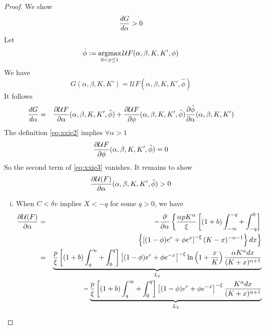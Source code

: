 \documentclass{article}
\begin{document}
\begin{proof}
  We show
  \[
  \frac{d G}{d \alpha} > 0
  \]
  Let
  \begin{equation}
    \label{eq:xxie2}
    \hat \phi := \operatorname*{argmax}_{0 < \phi \leq 1}
    \mathcal U F(\alpha, \beta, K, K', \phi)
  \end{equation}
  We have
  \[
  G(\alpha, \beta, K, K') = \mathcal U F(\alpha, \beta, K, K', \hat \phi)
  \]
  It follows
  \begin{eqnarray}
    \frac{d G}{d \alpha}
    &=&
    \frac{\partial \mathcal U F}{\partial \alpha}(\alpha, \beta, K, K', \hat \phi)
    + \frac{\partial \mathcal U F}{\partial \phi}(\alpha, \beta, K, K', \hat \phi)
    \frac{\partial \hat \phi}{\partial \alpha}(\alpha, \beta, K, K')
    \label{eq:xxie3}
  \end{eqnarray}
  The definition \eqref{eq:xxie2} implies $\forall \alpha > 1$
  \begin{equation}
    \label{eq:xxie4}
    \frac{\partial \mathcal U F}{\partial \phi}(\alpha, \beta, K, K', \hat \phi) = 0
  \end{equation}
  So the second term of \eqref{eq:xxie3} vanishes. It remains to show
  \[
  \frac{\partial \mathcal U(F)}{\partial \alpha}(\alpha, \beta, K, K', \hat \phi) > 0
  \]
  \begin{enumerate}[i.]
  \item When $C < \delta v$ implies $X < -q$ for some $q > 0$, we have
    \begin{eqnarray*}
      \pd{\mathcal U(F)}{\alpha}
      &=&
      - \frac{\partial}{\partial \alpha} \left\{
      {\alpha p K^\alpha \over \xi}
      \left[
      (1 + b)\int_{-\infty}^{-q} +
      \int_{-q}^0
      \right] \right. \\
      && \left.
      \left\{
      \left[
        (1 - \phi) e^r + \phi e^x
      \right]^{-\xi}
      (K - x)^{-\alpha - 1}
      \right\}
      dx \right\} \\
      &=&
      \underbrace{
      {p \over \xi}
      \left[
      (1 + b)\int_{q}^{\infty} +
      \int_{0}^q
      \right]
      \left[
        (1 - \phi) e^r + \phi e^{-x}
      \right]^{-\xi}
      \ln \left(
      1 + {x \over K}
      \right)
            {\alpha K^{\alpha} dx
              \over
              (K + x)^{\alpha + 1}
            }
      }_{L_1}\\
      && - \underbrace{
        {p \over \xi}
        \left[
          (1 + b)\int_{q}^{\infty} +
          \int_{0}^q
          \right]
        \left[
          (1 - \phi) e^r + \phi e^{-x}
          \right]^{-\xi}
        {K^{\alpha} dx \over (K + x)^{\alpha + 1} }
      }_{L_2} \\

\end{eqnarray*}
\end{enumerate}
\end{proof}
\end{document}
